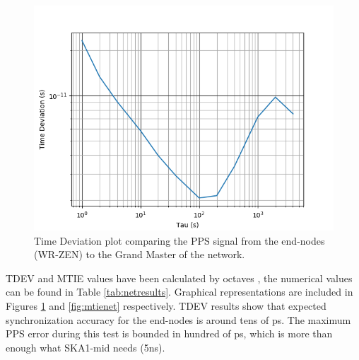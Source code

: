 \begin{figure}
	\centering
	\includegraphics[width=0.9\linewidth]{img/tdev_exp3}
	\caption[TDEV of the end-nodes in the scalability test.]{Time Deviation 
	plot comparing the PPS signal from the end-nodes (WR-ZEN) to the Grand 
	Master of the network.}
	\label{fig:tdevnet}
\end{figure}

TDEV and MTIE values have been calculated by octaves , the numerical values can 
be found in Table \ref{tab:netresults}. Graphical representations are included 
in Figures \ref{fig:tdevnet} and \ref{fig:mtienet} respectively. TDEV results 
show that expected synchronization accuracy for the end-nodes is around tens of 
ps. The maximum PPS error during this test is bounded in hundred of ps, which 
is more than enough what SKA1-mid needs (5ns).

